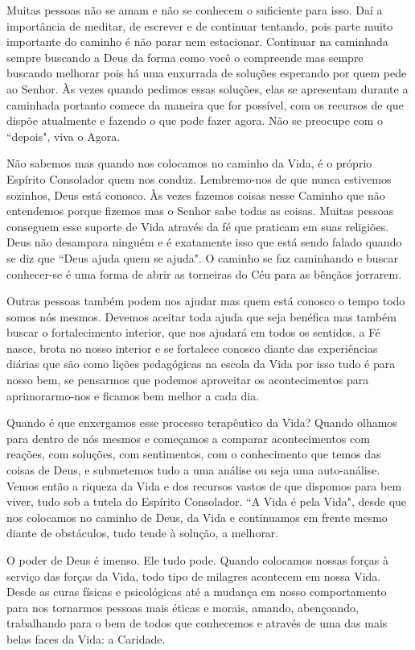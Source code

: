 \emdash{}Muitas pessoas não se amam e não se conhecem o suficiente para isso. Daí a importância de meditar, de escrever e de continuar tentando, pois parte muito importante do caminho é não parar nem estacionar. Continuar na caminhada sempre buscando a Deus da forma como você o compreende mas sempre buscando melhorar pois há uma enxurrada de soluções esperando por quem pede ao Senhor. Às vezes quando pedimos essas soluções, elas se apresentam durante a caminhada portanto comece da maneira que for possível, com os recursos de que dispõe atualmente e fazendo o que pode fazer agora. Não se preocupe com o ``depois", viva o Agora.

\emdash{}Não sabemos mas quando nos colocamos no caminho da Vida, é o próprio Espírito Consolador quem nos conduz. Lembremo-nos de que nunca estivemos sozinhos, Deus está conosco. Às vezes fazemos coisas nesse Caminho que não entendemos porque fizemos mas o Senhor sabe todas as coisas. Muitas pessoas conseguem esse suporte de Vida através da fé que praticam em suas religiões. Deus não desampara ninguém e é exatamente isso que está sendo falado quando se diz que ``Deus ajuda quem se ajuda". O caminho se faz caminhando e buscar conhecer-se é uma forma de abrir as torneiras do Céu para as bênçãos jorrarem.

\emdash{}Outras pessoas também podem nos ajudar mas quem está conosco o tempo todo somos nós mesmos. Devemos aceitar toda ajuda que seja benéfica mas também buscar o fortalecimento interior, que nos ajudará em todos os sentidos. a Fé nasce, brota no nosso interior e se fortalece conosco diante das experiências diárias que são como lições pedagógicas na escola da Vida por isso tudo é para nosso bem, se pensarmos que podemos aproveitar os acontecimentos para aprimorarmo-nos e ficamos bem melhor a cada dia.

\emdash{}Quando é que enxergamos esse processo terapêutico da Vida? Quando olhamos para dentro de nós mesmos e começamos a comparar acontecimentos com reações, com soluções, com sentimentos, com o conhecimento que temos das coisas de Deus, e submetemos tudo a uma análise ou seja uma auto-análise. Vemos então a riqueza da Vida e dos recursos vastos de que dispomos para bem viver, tudo sob a tutela do Espírito Consolador. ``A Vida é pela Vida", desde que nos colocamos no caminho de Deus, da Vida e continuamos em frente mesmo diante de obstáculos, tudo tende à solução, a melhorar.

\emdash{}O poder de Deus é imenso. Ele tudo pode. Quando colocamos nossas forças à serviço das forças da Vida, todo tipo de milagres acontecem em nossa Vida. Desde as curas físicas e psicológicas até a mudança em nosso comportamento para nos tornarmos pessoas mais éticas e morais, amando, abençoando, trabalhando para o bem de todos que conhecemos e através de uma das mais belas faces da Vida: a Caridade.

